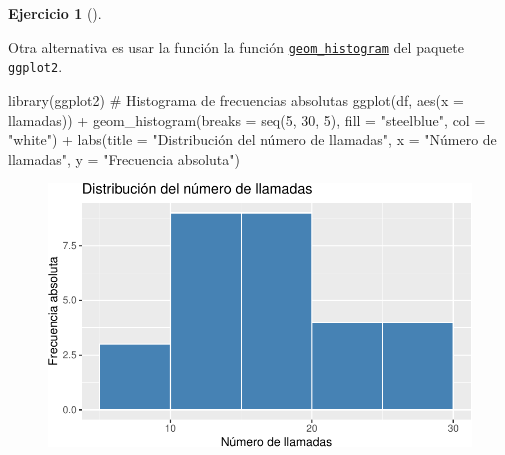 \documentclass[
  a4paper,
]{scrreport}
\newenvironment{Shaded}{\begin{snugshade}}{\end{snugshade}}
\newcommand{\AttributeTok}[1]{\textcolor[rgb]{0.40,0.45,0.13}{#1}}
\newcommand{\CommentTok}[1]{\textcolor[rgb]{0.37,0.37,0.37}{#1}}
\newcommand{\DecValTok}[1]{\textcolor[rgb]{0.68,0.00,0.00}{#1}}
\newcommand{\FunctionTok}[1]{\textcolor[rgb]{0.28,0.35,0.67}{#1}}
\newcommand{\NormalTok}[1]{\textcolor[rgb]{0.00,0.23,0.31}{#1}}
\newcommand{\SpecialCharTok}[1]{\textcolor[rgb]{0.37,0.37,0.37}{#1}}
\newcommand{\StringTok}[1]{\textcolor[rgb]{0.13,0.47,0.30}{#1}}
\theoremstyle{definition}
\newtheorem{exercise}{Ejercicio}[chapter]
\theoremstyle{remark}
\begin{document}
\begin{exercise}[]
\begin{tcolorbox}
Otra alternativa es usar la función la función
\href{https://aprendeconalf.es/manual-r/07-graficos.html\#histogramas}{\texttt{geom\_histogram}}
del paquete \texttt{ggplot2}.

\begin{Shaded}
\begin{Highlighting}[]
\FunctionTok{library}\NormalTok{(ggplot2)}
\CommentTok{\# Histograma de frecuencias absolutas}
\FunctionTok{ggplot}\NormalTok{(df, }\FunctionTok{aes}\NormalTok{(}\AttributeTok{x =}\NormalTok{ llamadas)) }\SpecialCharTok{+}
    \FunctionTok{geom\_histogram}\NormalTok{(}\AttributeTok{breaks =} \FunctionTok{seq}\NormalTok{(}\DecValTok{5}\NormalTok{, }\DecValTok{30}\NormalTok{, }\DecValTok{5}\NormalTok{), }\AttributeTok{fill =} \StringTok{"steelblue"}\NormalTok{, }\AttributeTok{col =} \StringTok{"white"}\NormalTok{) }\SpecialCharTok{+} 
    \FunctionTok{labs}\NormalTok{(}\AttributeTok{title =} \StringTok{"Distribución del número de llamadas"}\NormalTok{, }\AttributeTok{x =} \StringTok{"Número de llamadas"}\NormalTok{, }\AttributeTok{y =} \StringTok{"Frecuencia absoluta"}\NormalTok{)}
\end{Highlighting}
\end{Shaded}

\begin{figure}[H]

{\centering \includegraphics{./03-frecuencias-graficos_files/figure-pdf/unnamed-chunk-19-1.pdf}

}

\end{figure}


\end{tcolorbox}
\end{exercise}
\end{document}
